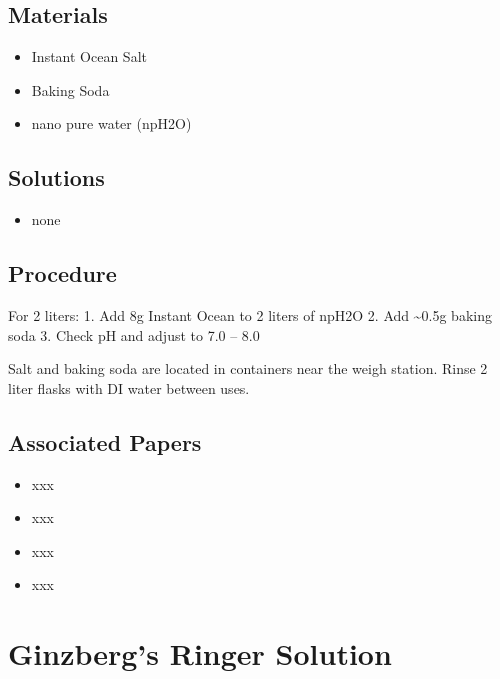 \documentclass[
  letterpaper,
  DIV=11,
  numbers=noendperiod]{scrreprt}
\providecommand{\tightlist}{%
  \setlength{\itemsep}{0pt}\setlength{\parskip}{0pt}}\usepackage{longtable,booktabs,array}
\begin{document}
\hypertarget{materials-88}{%
\section{Materials}\label{materials-88}}

\begin{itemize}
\tightlist
\item
  Instant Ocean Salt
\item
  Baking Soda
\item
  nano pure water (npH2O)
\end{itemize}

\hypertarget{solutions-79}{%
\section{Solutions}\label{solutions-79}}

\begin{itemize}
\tightlist
\item
  none
\end{itemize}

\hypertarget{procedure-87}{%
\section{Procedure}\label{procedure-87}}

For 2 liters: 1. Add 8g Instant Ocean to 2 liters of npH2O 2. Add
\textasciitilde0.5g baking soda 3. Check pH and adjust to 7.0 -- 8.0

Salt and baking soda are located in containers near the weigh station.
Rinse 2 liter flasks with DI water between uses.

\hypertarget{associated-papers-62}{%
\section{Associated Papers}\label{associated-papers-62}}

\begin{itemize}
\tightlist
\item
  xxx
\item
  xxx
\item
  xxx
\item
  xxx
\end{itemize}

\hypertarget{sec-recipe-ginzbergs_ringers}{%
\chapter{Ginzberg's Ringer
Solution}\label{sec-recipe-ginzbergs_ringers}}
\end{document}
